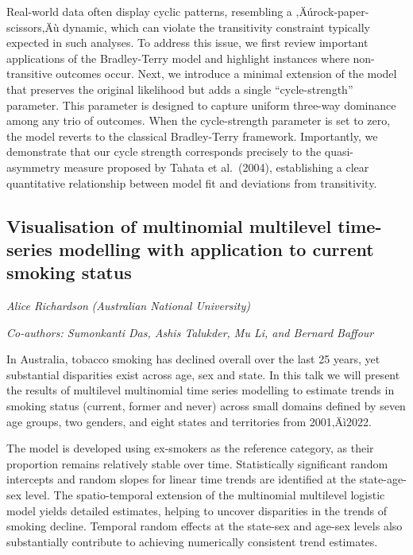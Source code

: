 \documentclass[
]{scrreprt}
\begin{document}
Real-world data often display cyclic patterns, resembling a
‚Äúrock-paper-scissors‚Äù dynamic, which can violate the transitivity
constraint typically expected in such analyses. To address this issue,
we first review important applications of the Bradley-Terry model and
highlight instances where non-transitive outcomes occur. Next, we
introduce a minimal extension of the model that preserves the original
likelihood but adds a single ``cycle-strength'' parameter. This
parameter is designed to capture uniform three-way dominance among any
trio of outcomes. When the cycle-strength parameter is set to zero, the
model reverts to the classical Bradley-Terry framework. Importantly, we
demonstrate that our cycle strength corresponds precisely to the
quasi-asymmetry measure proposed by Tahata et al.~(2004), establishing a
clear quantitative relationship between model fit and deviations from
transitivity.

\subsection{Visualisation of multinomial multilevel time-series
modelling with application to current smoking
status}\label{visualisation-of-multinomial-multilevel-time-series-modelling-with-application-to-current-smoking-status}

\emph{Alice Richardson} \emph{(Australian
National University)}

\emph{Co-authors: Sumonkanti Das, Ashis Talukder, Mu Li, and Bernard
Baffour}

\setlength{\parskip}{0.5em}

In Australia, tobacco smoking has declined overall over the last 25
years, yet substantial disparities exist across age, sex and state. In
this talk we will present the results of multilevel multinomial time
series modelling to estimate trends in smoking status (current, former
and never) across small domains defined by seven age groups, two
genders, and eight states and territories from 2001‚Äì2022.

The model is developed using ex-smokers as the reference category, as
their proportion remains relatively stable over time. Statistically
significant random intercepts and random slopes for linear time trends
are identified at the state-age-sex level. The spatio-temporal extension
of the multinomial multilevel logistic model yields detailed estimates,
helping to uncover disparities in the trends of smoking decline.
Temporal random effects at the state-sex and age-sex levels also
substantially contribute to achieving numerically consistent trend
estimates.
\end{document}
